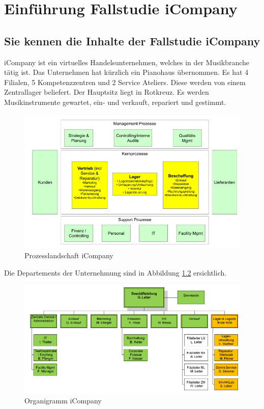 \chapter{Einführung Fallstudie iCompany}
\section{Sie kennen die Inhalte der Fallstudie iCompany}
iCompany ist ein virtuelles Handelsunternehmen, welches in der Musikbranche tätig ist. Das Unternehmen hat kürzlich ein Pianohaus übernommen. Es hat 4 Filialen, 5 Kompetenzzentren und 2 Service Ateliers. Diese werden von einem Zentrallager beliefert. Der Hauptsitz liegt in Rotkreuz.
Es werden Musikinstrumente gewartet, ein- und verkauft, repariert und gestimmt.
\begin{figure}
\centering
\includegraphics[width=0.9\linewidth]{fig/prozesslandschaft_icompany}
\caption{Prozesslandschaft iCompany}
\label{fig:prozesslandschafticompany}
\end{figure}

Die Departements der Unternehmung sind in Abbildung \ref{fig:organigramm_icompany} ersichtlich.
\begin{figure}
	\centering
	\includegraphics[width=0.9\linewidth]{fig/organigramm_icompany}
	\caption{Organigramm iCompany}
	\label{fig:organigramm_icompany}
\end{figure}


